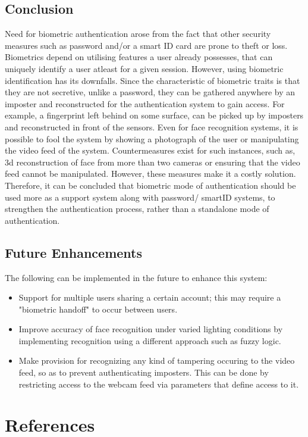 \documentclass[12pt]{article}			%
\begin{document}
\subsection {Conclusion}
Need for biometric authentication arose from the fact that other security measures such as password and/or a smart ID card are prone to theft or loss. Biometrics depend on utilising features a user already possesses, that can uniquely identify a user atleast for a given session. However, using biometric identification has its downfalls. Since the characteristic of biometric traits is that they are not secretive, unlike a password, they can be gathered anywhere by an imposter and reconstructed for the authentication system to gain access. For example, a fingerprint left behind on some surface, can be picked up by imposters and reconstructed in front of the sensors. Even for face recognition systems, it is possible to fool the system by showing a photograph of the user or manipulating the video feed of the system. Countermeasures exist for such instances, such as, 3d reconstruction of face from more than two cameras or ensuring that the video feed cannot be manipulated. However, these measures make it a costly solution. Therefore, it can be concluded that biometric mode of authentication should be used more as a support system along with password/ smartID systems, to strengthen the authentication process, rather than a standalone mode of authentication.   

\subsection {Future Enhancements}
The following can be implemented in the future to enhance this system:
\begin{itemize}
\item Support for multiple users sharing a certain account; this may require a "biometric handoff" to occur between users.
\item Improve accuracy of face recognition under varied lighting conditions by implementing recognition using a different approach such as fuzzy logic.
\item Make provision for recognizing any kind of tampering occuring to the video feed, so as to prevent authenticating imposters. This can be done by restricting access to the webcam feed via parameters that define access to it.
\end{itemize}


\section{ References }

\end{document}
